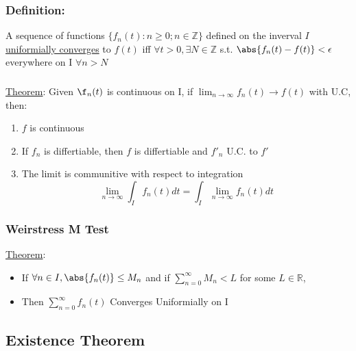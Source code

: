 \documentclass[11pt]{article}
\begin{document}
\subsubsection{Definition:}
\label{sec-9.6.1}

    A sequence of functions $\{f_n(t) : n\geq 0 ; n\in\mathbb{Z}\}$
    defined on the inverval $I$ \underline{uniformially converges} to $f(t)$ iff
    $\forall t > 0, \exists N\in \mathbb{Z}$ s.t. $\abs{f_n(t)-f(t)}
    < \epsilon$ everywhere on I $\forall n > N$
\subsubsection{}

    \underline{Theorem}: Given $\f_n(t)$ is continuous on I, if
    $\lim_{n\rightarrow \infty}{f_n(t)} \rightarrow f(t)$ with U.C, then:
\begin{enumerate}
\item $f$ is continuous
\item If $f_n$ is differtiable, then $f$ is differtiable and $f'_n$
          U.C. to $f'$
\item The limit is communitive with respect to integration
         \begin{equation}
         \lim_{n\rightarrow \infty}\int_I f_n(t)dt = \int_I \lim_{n\rightarrow \infty} f_n(t) dt
         \end{equation}
\end{enumerate}
\subsubsection{Weirstress M Test}
\label{sec-9.6.3}

    \underline{Theorem}: 
\begin{itemize}
\item If $\forall n \in I, \abs{f_n(t)} \leq M_n$ and if $\sum_{n=0}^\infty M_n< L$ for some $L\in \mathbb{R}$,
\item Then $\sum_{n=0}^\infty f_n(t)$ Converges Uniformially on I
\end{itemize}
\subsection{Existence Theorem}
\label{sec-9.7}
\end{document}

